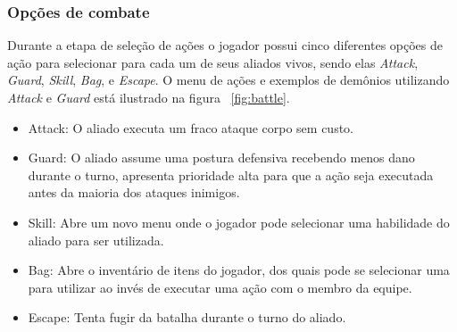 \subsubsection{Opções de combate}\label{chap:BattleOptions}

Durante a etapa de seleção de ações o jogador possui cinco diferentes opções de ação para selecionar para cada um de seus aliados vivos, sendo elas \emph{Attack}, \emph{Guard}, \emph{Skill}, \emph{Bag}, e \emph{Escape}. O menu de ações e exemplos de demônios utilizando \emph{Attack} e \emph{Guard} está ilustrado na figura ~\ref{fig:battle}.

\begin{itemize}

\item Attack: O aliado executa um fraco ataque corpo sem custo.
\item Guard: O aliado assume uma postura defensiva recebendo menos dano durante o turno, apresenta prioridade alta para que a ação seja executada antes da maioria dos ataques inimigos.
\item Skill: Abre um novo menu onde o jogador pode selecionar uma habilidade do aliado para ser utilizada.
\item Bag: Abre o inventário de itens do jogador, dos quais pode se selecionar uma para utilizar ao invés de executar uma ação com o membro da equipe.
\item Escape: Tenta fugir da batalha durante o turno do aliado.

\end{itemize}

